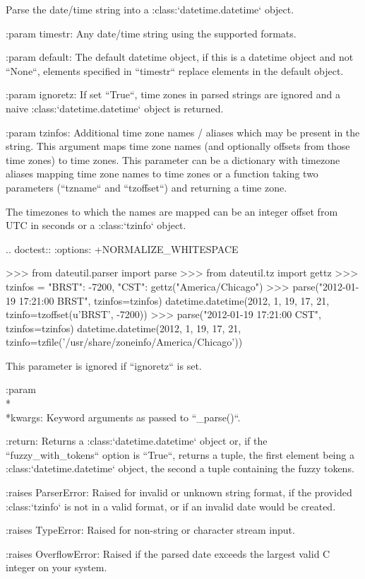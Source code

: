 \begin{DoxyVerb}Parse the date/time string into a :class:`datetime.datetime` object.

:param timestr:
    Any date/time string using the supported formats.

:param default:
    The default datetime object, if this is a datetime object and not
    ``None``, elements specified in ``timestr`` replace elements in the
    default object.

:param ignoretz:
    If set ``True``, time zones in parsed strings are ignored and a
    naive :class:`datetime.datetime` object is returned.

:param tzinfos:
    Additional time zone names / aliases which may be present in the
    string. This argument maps time zone names (and optionally offsets
    from those time zones) to time zones. This parameter can be a
    dictionary with timezone aliases mapping time zone names to time
    zones or a function taking two parameters (``tzname`` and
    ``tzoffset``) and returning a time zone.

    The timezones to which the names are mapped can be an integer
    offset from UTC in seconds or a :class:`tzinfo` object.

    .. doctest::
       :options: +NORMALIZE_WHITESPACE

>>> from dateutil.parser import parse
>>> from dateutil.tz import gettz
>>> tzinfos = {"BRST": -7200, "CST": gettz("America/Chicago")}
>>> parse("2012-01-19 17:21:00 BRST", tzinfos=tzinfos)
datetime.datetime(2012, 1, 19, 17, 21, tzinfo=tzoffset(u'BRST', -7200))
>>> parse("2012-01-19 17:21:00 CST", tzinfos=tzinfos)
datetime.datetime(2012, 1, 19, 17, 21,
                  tzinfo=tzfile('/usr/share/zoneinfo/America/Chicago'))

    This parameter is ignored if ``ignoretz`` is set.

:param \\*\\*kwargs:
    Keyword arguments as passed to ``_parse()``.

:return:
    Returns a :class:`datetime.datetime` object or, if the
    ``fuzzy_with_tokens`` option is ``True``, returns a tuple, the
    first element being a :class:`datetime.datetime` object, the second
    a tuple containing the fuzzy tokens.

:raises ParserError:
    Raised for invalid or unknown string format, if the provided
    :class:`tzinfo` is not in a valid format, or if an invalid date
    would be created.

:raises TypeError:
    Raised for non-string or character stream input.

:raises OverflowError:
    Raised if the parsed date exceeds the largest valid C integer on
    your system.
\end{DoxyVerb}
 

